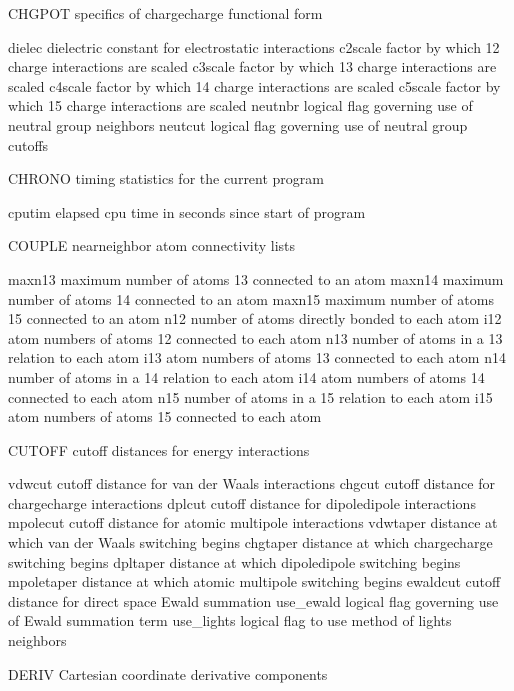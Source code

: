 \documentclass[letterpaper,11pt,english]{sphinxmanual}
\begin{document}
CHGPOT  specifics of charge\sphinxhyphen{}charge functional form

dielec  dielectric constant for electrostatic interactions
c2scale factor by which 1\sphinxhyphen{}2 charge interactions are scaled
c3scale factor by which 1\sphinxhyphen{}3 charge interactions are scaled
c4scale factor by which 1\sphinxhyphen{}4 charge interactions are scaled
c5scale factor by which 1\sphinxhyphen{}5 charge interactions are scaled
neutnbr logical flag governing use of neutral group neighbors
neutcut logical flag governing use of neutral group cutoffs

CHRONO  timing statistics for the current program

cputim  elapsed cpu time in seconds since start of program

COUPLE  near\sphinxhyphen{}neighbor atom connectivity lists

maxn13  maximum number of atoms 1\sphinxhyphen{}3 connected to an atom
maxn14  maximum number of atoms 1\sphinxhyphen{}4 connected to an atom
maxn15  maximum number of atoms 1\sphinxhyphen{}5 connected to an atom
n12     number of atoms directly bonded to each atom
i12     atom numbers of atoms 1\sphinxhyphen{}2 connected to each atom
n13     number of atoms in a 1\sphinxhyphen{}3 relation to each atom
i13     atom numbers of atoms 1\sphinxhyphen{}3 connected to each atom
n14     number of atoms in a 1\sphinxhyphen{}4 relation to each atom
i14     atom numbers of atoms 1\sphinxhyphen{}4 connected to each atom
n15     number of atoms in a 1\sphinxhyphen{}5 relation to each atom
i15     atom numbers of atoms 1\sphinxhyphen{}5 connected to each atom

CUTOFF  cutoff distances for energy interactions

vdwcut  cutoff distance for van der Waals interactions
chgcut  cutoff distance for charge\sphinxhyphen{}charge interactions
dplcut  cutoff distance for dipole\sphinxhyphen{}dipole interactions
mpolecut        cutoff distance for atomic multipole interactions
vdwtaper        distance at which van der Waals switching begins
chgtaper        distance at which charge\sphinxhyphen{}charge switching begins
dpltaper        distance at which dipole\sphinxhyphen{}dipole switching begins
mpoletaper      distance at which atomic multipole switching begins
ewaldcut        cutoff distance for direct space Ewald summation
use\_ewald       logical flag governing use of Ewald summation term
use\_lights      logical flag to use method of lights neighbors

DERIV   Cartesian coordinate derivative components
\end{document}
